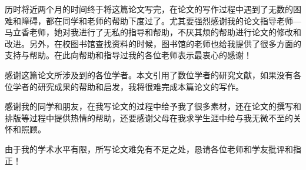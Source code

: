 
历时将近两个月的时间终于将这篇论文写完，在论文的写作过程中遇到了无数的困难和障碍，都在同学和老师的帮助下度过了。尤其要强烈感谢我的论文指导老师—马立香老师，她对我进行了无私的指导和帮助，不厌其烦的帮助进行论文的修改和改进。另外，在校图书馆查找资料的时候，图书馆的老师也给我提供了很多方面的支持与帮助。在此向帮助和指导过我的各位老师表示最衷心的感谢！

感谢这篇论文所涉及到的各位学者。本文引用了数位学者的研究文献，如果没有各位学者的研究成果的帮助和启发，我将很难完成本篇论文的写作。

感谢我的同学和朋友，在我写论文的过程中给予我了很多素材，还在论文的撰写和排版等过程中提供热情的帮助，还要感谢父母在我求学生涯中给与我无微不至的关怀和照顾。

由于我的学术水平有限，所写论文难免有不足之处，恳请各位老师和学友批评和指正！
